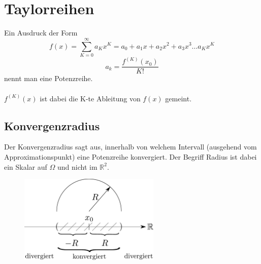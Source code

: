 



















\section{Taylorreihen}
Ein Ausdruck der Form 
\[ \boxed{f(x) = \sum_{K = 0}^{\infty} a_K x^K = a_0 + a_1 x + a_2 x^2 + a_3 x^3 \dots a_K x^K} \]
\[ \boxed{a_k = \frac{f^{(K)}(x_0)}{K!}} \]
nennt man eine Potenzreihe. \\\\
$f^{(K)}(x)$ ist dabei die K-te Ableitung von $f(x)$ gemeint. 

\subsection{Konvergenzradius}
Der Konvergenzradius sagt aus, innerhalb von welchem Intervall (ausgehend vom Approximationspunkt)
eine Potenzreihe konvergiert. Der Begriff Radius ist dabei ein Skalar auf $\Omega$ und nicht im $\mathbb{R}^2$.

\begin{figure}[h!]
\centering
\includegraphics[width=0.6\textwidth]{konvergenzradius.pdf}
\end{figure}

